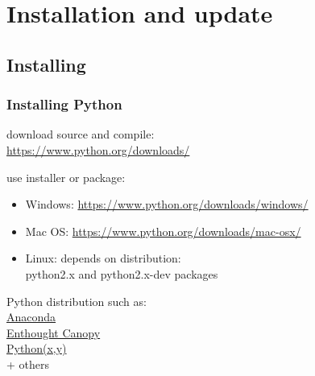 \section{Installation and update}

\subsection{Installing}

\begin{frame}
\frametitle{Installing Python}

\begin{description}

\item<1->[Hard way:] download source and compile:\\
\url{https://www.python.org/downloads/}

\item<2->[Normal way:] use installer or package:

\begin{itemize}
\item Windows: \url{https://www.python.org/downloads/windows/}
\item Mac OS: \url{https://www.python.org/downloads/mac-osx/}
\item Linux: depends on distribution:\\
python2.x and python2.x-dev packages
\end{itemize}

\item<3->[Easy way:] Python distribution such as:\\
\href{https://www.continuum.io/downloads}{Anaconda} \\
\href{https://www.enthought.com/products/canopy/}{Enthought Canopy} \\
\href{http://python-xy.github.io/}{Python(x,y)} \\
+ others

\end{description}

\end{frame}

